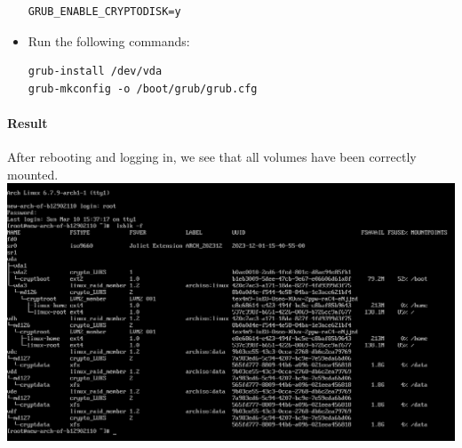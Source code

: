 \documentclass[12pt, a4paper]{article}
\begin{document}
\begin{itemize}
\begin{footnotesize}
\begin{verbatim}
GRUB_ENABLE_CRYPTODISK=y\end{verbatim}
    \end{footnotesize}
    \item Run the following commands:
    \begin{verbatim}
grub-install /dev/vda
grub-mkconfig -o /boot/grub/grub.cfg\end{verbatim}
  \end{itemize}

  \paragraph{Result}
  After rebooting and logging in, we see that all volumes have been correctly
  mounted.
  \includegraphics[width=\textwidth]{7_result.png}
\end{document}
